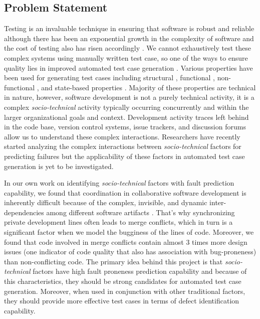 \documentclass[10pt]{article}
\begin{document}
\subsection{Problem Statement}
Testing is an invaluable technique in ensuring that software is robust and reliable although there has been an exponential growth in the complexity of software and the cost of testing also has risen accordingly \cite{myers2011art}. We cannot exhaustively test these complex systems using manually written test case, so one of the ways to ensure quality lies in improved automated test case generation \cite{anand2013orchestrated,harman2012search}. Various properties have been used for generating test cases including
structural \cite{tonella2004evolutionary}, functional \cite{wegener2004evaluation}, non-functional \cite{wegener1998verifying}, and state-based properties \cite{oh2011transition}. 
Majority of these properties are technical in nature, however, software development is not a purely technical activity, it is a complex \emph{socio-technical} activity typically occurring concurrently and within the larger organizational goals and context. Development activity
traces left behind in the code base, version control systems, issue trackers, and discussion forums allow us to understand these complex interactions. Researchers have recently started analyzing the complex interactions between \emph{socio-technical} factors for predicting failures but the applicability of these factors in automated test case generation is yet to be investigated.

In our own work on identifying \emph{socio-technical} factors with fault prediction capability, we found that coordination in collaborative software development is inherently difficult because of the complex, invisible, and dynamic inter-dependencies among different software artifacts \cite{ahmedempirical}. That’s why synchronizing private development lines often leads to merge conflicts, which in turn is a significant factor when we model the bugginess of the lines of code. Moreover, we found that code involved in merge conflicts contain almost 3 times more design issues (one indicator of code quality that also has association with bug-proneness) than non-conflicting code. The primary idea behind this project is that \emph{socio-technical} factors have high fault proneness prediction capability and because of this characteristics, they should be strong candidates for automated test case generation. Moreover, when used in conjunction with other traditional factors, they should provide more effective test cases in terms of defect identification capability.  
\end{document}
